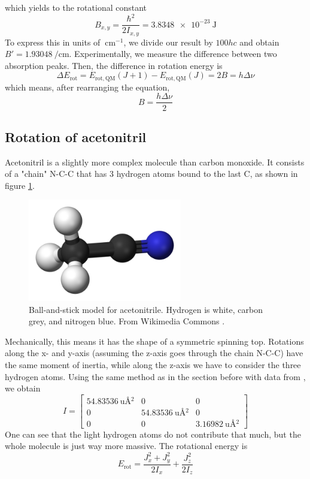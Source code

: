 \documentclass[a4paper,10pt]{scrartcl}
\begin{document}
which yields to the rotational constant
\[
B_{x,y} = \frac{\hbar^2}{2I_{x,y}} = \SI{3.8348 e-23}{\joule}
\]
To express this in units of $\SI{}{\centi\meter^{-1}}$, we divide our result by $100 hc$ and obtain $B' = \SI{1.93048}{\per\centi\meter}$. Experimentally, we measure the difference between two absorption peaks. Then, the difference in rotation energy is
\begin{equation}
\Delta E_\mathrm{rot} = E_\mathrm{rot, QM}(J+1) - E_\mathrm{rot, QM}(J) = 2B =  h \Delta \nu
\end{equation}
which means, after rearranging the equation,
\begin{equation}\label{eq:rot_constant_frequency}
B = \frac{h\Delta \nu}{2}
\end{equation}

\subsection{Rotation of acetonitril}

Acetonitril is a slightly more complex molecule than carbon monoxide. It consists of a "chain" N-C-C that has 3 hydrogen atoms bound to the last C, as shown in figure \ref{fig:aceto_model}.

\begin{figure}[H]
\centering
\includegraphics[width=0.6\textwidth]{img/acetonitrile_model}
\caption{Ball-and-stick model for acetonitrile. Hydrogen is white, carbon grey, and nitrogen blue. From Wikimedia Commons \cite{wiki}.}
\label{fig:aceto_model}
\end{figure}


Mechanically, this means it has the shape of a symmetric spinning top. Rotations along the x- and y-axis (assuming the z-axis goes through the chain N-C-C) have the same moment of inertia, while along the z-axis we have to consider the three hydrogen atoms. Using the same method as in the section before with data from \cite{nist2}, we obtain
\[
I = \begin{bmatrix}
\SI{54.83536}{\amu\angstrom^2} & 0 & 0 \\ 
0 & \SI{54.83536}{\amu\angstrom^2} & 0 \\ 
0 & 0 & \SI{3.16982}{\amu\angstrom^2}
\end{bmatrix} 
\]
One can see that the light hydrogen atoms do not contribute that much, but the whole molecule is just way more massive. The rotational energy is
\begin{equation}
E_\mathrm{rot} = \frac{J_x^2 + J_y^2}{2I_x} + \frac{J_z^2}{2I_z}
\end{equation}
\end{document}
